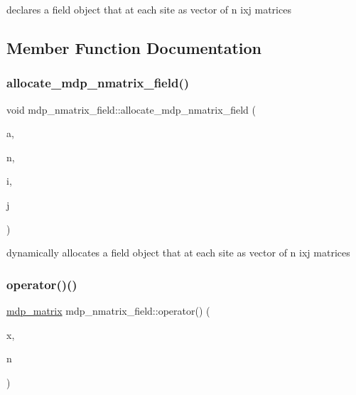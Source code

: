 declares a field object that at each site as vector of n ixj matrices 



\subsection{Member Function Documentation}
\mbox{\label{classmdp__nmatrix__field_ad8803e7b0f9a755329a1d7335ac0c019}} 
\subsubsection{\texorpdfstring{allocate\+\_\+mdp\+\_\+nmatrix\+\_\+field()}{allocate\_mdp\_nmatrix\_field()}}
{\footnotesize\ttfamily void mdp\+\_\+nmatrix\+\_\+field\+::allocate\+\_\+mdp\+\_\+nmatrix\+\_\+field (\begin{DoxyParamCaption}\item[{\hyperlink{classmdp__lattice}{mdp\+\_\+lattice} \&}]{a,  }\item[{int}]{n,  }\item[{int}]{i,  }\item[{int}]{j }\end{DoxyParamCaption})\hspace{0.3cm}{\ttfamily [inline]}}



dynamically allocates a field object that at each site as vector of n ixj matrices 

\mbox{\label{classmdp__nmatrix__field_a389126da9ddf86d42b27d4d9d20245f8}} 
\subsubsection{\texorpdfstring{operator()()}{operator()()}\hspace{0.1cm}{\footnotesize\ttfamily [1/3]}}
{\footnotesize\ttfamily \hyperlink{classmdp__matrix}{mdp\+\_\+matrix} mdp\+\_\+nmatrix\+\_\+field\+::operator() (\begin{DoxyParamCaption}\item[{\hyperlink{classmdp__site}{mdp\+\_\+site}}]{x,  }\item[{int}]{n }\end{DoxyParamCaption})\hspace{0.3cm}{\ttfamily [inline]}}



